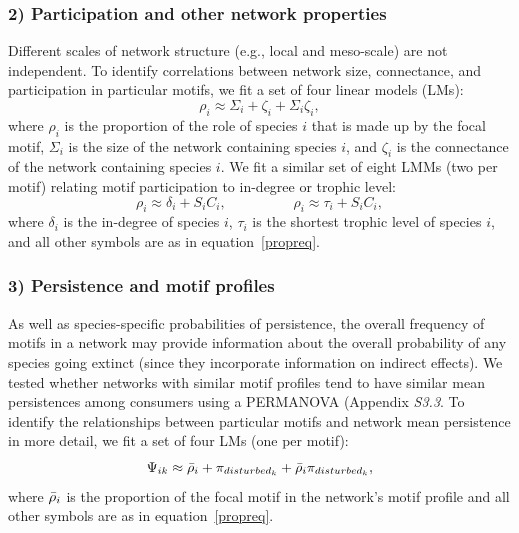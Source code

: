 \documentclass[12pt]{article}
\begin{document}
\begin{spacing}{2.0}
    \subsubsection*{2) Participation and other network properties}    


        Different scales of network structure (e.g., local and meso-scale) are not independent. 
        To identify correlations between network size, connectance, and participation in particular motifs, we fit a set of four linear models (LMs):
        \begin{equation}
            \rho_{i} \approx \Sigma_{i} + \zeta_{i} + \Sigma_{i}\zeta_{i} ,
            \label{partic_SC}
        \end{equation}
        \noindent where $\rho_{i}$ is the proportion of the role of species $i$ that is made up by the focal motif,
        $\Sigma_{i}$ is the size of the network containing species $i$, and $\zeta_{i}$ is the connectance of the network containing species $i$.
        We fit a similar set of eight LMMs (two per motif) relating motif participation to in-degree or trophic level:
        \begin{equation}
            \rho_{i} \approx \delta_{i} + S_{i}C_{i} , \hspace{2cm} 
            \rho_{i} \approx \tau_{i} + S_{i}C_{i} ,
            \label{partic_degTL}
        \end{equation}
        \noindent where $\delta_{i}$ is the in-degree of species $i$, $\tau_{i}$ is the shortest trophic level of species $i$, and all other symbols are as in equation~\ref{propreq}.   
        
        
    \subsubsection*{3) Persistence and motif profiles}

        As well as species-specific probabilities of persistence, the overall frequency of motifs in a network may provide information about the overall probability of any species going extinct (since they incorporate information on indirect effects).
        We tested whether networks with similar motif profiles tend to have similar mean persistences among consumers using a PERMANOVA (Appendix \emph{S3.3}.
        To identify the relationships between particular motifs and network mean persistence in more detail, we fit a set of four LMs (one per motif):
            \begin{equation}
                \Psi_{ik} \approx \Bar{\rho}_{i} + \pi_{disturbed_k} + \Bar{\rho}_{i}\pi_{disturbed_k},
                \label{netpropeq}
            \end{equation}
        \noindent where $\Bar{\rho}_{i}$ is the proportion of the focal motif in the network's motif profile and all other symbols are as in equation~\ref{propreq}.
            

\end{spacing}
\end{document}
